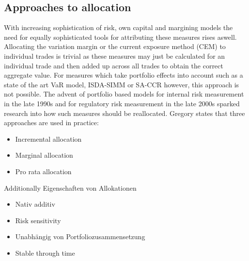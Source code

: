\documentclass[12pt,a4paper]{article}
\begin{document}
\subsection{Approaches to allocation}
With increasing sophistication of risk, own capital and margining models the need for equally sophisticated tools for attributing these measures rises aswell. Allocating the variation margin or the current exposure method (CEM) to individual trades is trivial as these measures may just be calculated for an individual trade and then added up across all trades to obtain the correct aggregate value. For measures which take portfolio effects into account such as a state of the art VaR model, ISDA-SIMM or SA-CCR however, this approach is not possible. The advent of portfolio based models for internal risk measurement in the late 1990s and for regulatory risk measurement in the late 2000s sparked research into how such measures should be reallocated. Gregory \cite[Chapter~10.7]{gregory2015xva} states that three approaches are used in practice: \begin{itemize}
\item Incremental allocation
\item Marginal allocation 
\item Pro rata allocation
\end{itemize}
Additionally \citep{koyluoglu2002risk}
Eigenschaften von Allokationen
\begin{itemize}
\item Nativ additiv
\item Risk sensitivity
\item Unabhängig von Portfoliozusammensetzung
\item Stable through time
\end{itemize}
\end{document}
